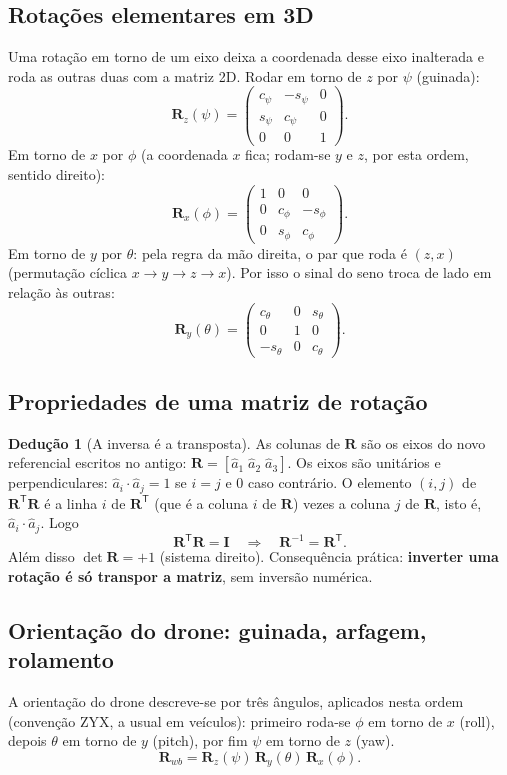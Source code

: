 \documentclass[11pt,a4paper]{article}
\newcommand{\Rot}{\mathbf{R}}
\newcommand{\Id}{\mathbf{I}}
\newcommand{\T}{^{\mathsf{T}}}
\theoremstyle{definition}
\newtheorem{deducao}{Dedução}[section]
\begin{document}
\subsection{Rotações elementares em 3D}
Uma rotação em torno de um eixo deixa a coordenada desse eixo inalterada e roda as outras duas com a matriz 2D. Rodar em torno de $z$ por $\psi$ (guinada):
\[
\Rot_z(\psi)=\begin{pmatrix}c_\psi&-s_\psi&0\\ s_\psi&c_\psi&0\\0&0&1\end{pmatrix}.
\]
Em torno de $x$ por $\phi$ (a coordenada $x$ fica; rodam-se $y$ e $z$, por esta ordem, sentido direito):
\[
\Rot_x(\phi)=\begin{pmatrix}1&0&0\\0&c_\phi&-s_\phi\\0&s_\phi&c_\phi\end{pmatrix}.
\]
Em torno de $y$ por $\theta$: pela regra da mão direita, o par que roda é $(z,x)$ (permutação cíclica $x\to y\to z\to x$). Por isso o sinal do seno troca de lado em relação às outras:
\[
\Rot_y(\theta)=\begin{pmatrix}c_\theta&0&s_\theta\\0&1&0\\-s_\theta&0&c_\theta\end{pmatrix}.
\]

\subsection{Propriedades de uma matriz de rotação}
\begin{deducao}[A inversa é a transposta]
As colunas de $\Rot$ são os eixos do novo referencial escritos no antigo: $\Rot=[\hat{a}_1\;\hat{a}_2\;\hat{a}_3]$. Os eixos são unitários e perpendiculares: $\hat{a}_i\cdot\hat{a}_j=1$ se $i=j$ e $0$ caso contrário. O elemento $(i,j)$ de $\Rot\T\Rot$ é a linha $i$ de $\Rot\T$ (que é a coluna $i$ de $\Rot$) vezes a coluna $j$ de $\Rot$, isto é, $\hat{a}_i\cdot\hat{a}_j$. Logo
\[
\Rot\T\Rot=\Id\quad\Longrightarrow\quad\Rot^{-1}=\Rot\T .
\]
Além disso $\det\Rot=+1$ (sistema direito). Consequência prática: \textbf{inverter uma rotação é só transpor a matriz}, sem inversão numérica.
\end{deducao}

\subsection{Orientação do drone: guinada, arfagem, rolamento}
A orientação do drone descreve-se por três ângulos, aplicados nesta ordem (convenção ZYX, a usual em veículos): primeiro roda-se $\phi$ em torno de $x$ (roll), depois $\theta$ em torno de $y$ (pitch), por fim $\psi$ em torno de $z$ (yaw).
\begin{equation}
\Rot_{wb}=\Rot_z(\psi)\,\Rot_y(\theta)\,\Rot_x(\phi).
\end{equation}
\end{document}
